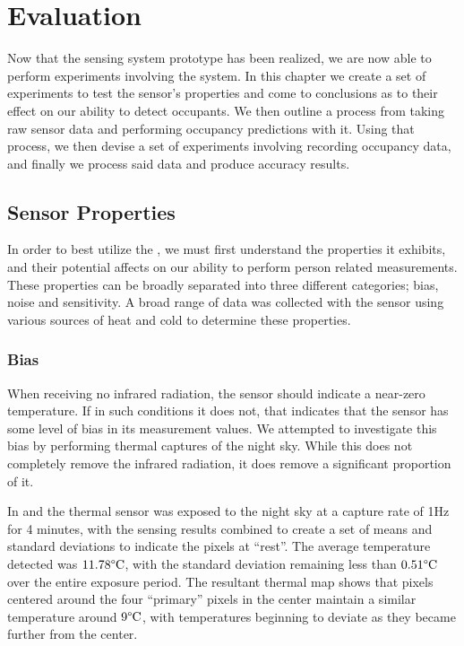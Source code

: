 \documentclass[../thesis/thesis.tex]{subfiles}
\begin{document}
 \chapter{Evaluation}
 \label{chap:evaluation}

 Now that the sensing system prototype has been realized, we are now able to perform experiments involving the system. In this chapter we create a set of experiments to test the sensor's properties and come to conclusions as to their effect on our ability to detect occupants. We then outline a process from taking raw sensor data and performing occupancy predictions with it. Using that process, we then devise a set of experiments involving recording occupancy data, and finally we process said data and produce accuracy results.

\section{Sensor Properties}

In order to best utilize the \mlx, we must first understand the properties it exhibits, and their potential affects on our ability to perform person related measurements. These properties can be broadly separated into three different categories; bias, noise and sensitivity. A broad range of data was collected with the sensor using various sources of heat and cold to determine these properties.

\subsection{Bias}
When receiving no infrared radiation, the sensor should indicate a near-zero temperature. If in such conditions it does not, that indicates that the sensor has some level of bias in its measurement values. We attempted to investigate this bias by performing thermal captures of the night sky. While this does not completely remove the infrared radiation, it does remove a significant proportion of it.

In  and  the thermal sensor was exposed to the night sky at a capture rate of 1Hz for 4 minutes, with the sensing results combined to create a set of means and standard deviations to indicate the pixels at ``rest''. The average temperature detected was $11.78\degree\textrm{C}$, with the standard deviation remaining less than $0.51\degree\textrm{C}$ over the entire exposure period. The resultant thermal map shows that pixels centered around the four ``primary'' pixels in the center maintain a similar temperature around $9\degree\textrm{C}$, with temperatures beginning to deviate as they became further from the center.
\end{document}
